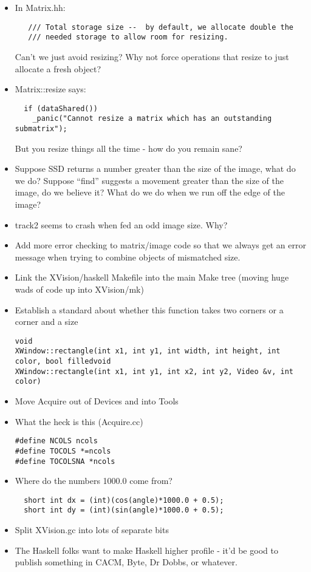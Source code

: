 \begin{itemize}
\item
In Matrix.hh:
\begin{verbatim}
   /// Total storage size --  by default, we allocate double the
   /// needed storage to allow room for resizing.
\end{verbatim}
Can't we just avoid resizing?
Why not force operations that resize to just allocate a fresh object?

\item
Matrix::resize says:
\begin{verbatim}
  if (dataShared())
    _panic("Cannot resize a matrix which has an outstanding submatrix");
\end{verbatim}
But you resize things all the time - how do you remain sane?

\item
Suppose SSD returns a number greater than the size of the image, what
do we do?  Suppose ``find'' suggests a movement greater than the size
of the image, do we believe it?  What do we do when we run off the
edge of the image?

\item
track2 seems to crash when fed an odd image size.  Why?

\item
Add more error checking to matrix/image code so that we always get an
error message when trying to combine objects of mismatched size.

\item
Link the XVision/haskell Makefile into the main Make tree
(moving huge wads of code up into XVision/mk)

\item
Establish a standard about whether this function takes two corners
or a corner and a size
\begin{verbatim}
void
XWindow::rectangle(int x1, int y1, int width, int height, int color, bool filledvoid
XWindow::rectangle(int x1, int y1, int x2, int y2, Video &v, int color)
\end{verbatim}

\item
Move Acquire out of Devices and into Tools

\item
What the heck is this (Acquire.cc)
\begin{verbatim}
#define NCOLS ncols
#define TOCOLS *=ncols
#define TOCOLSNA *ncols
\end{verbatim}

\item
Where do the numbers 1000.0 come from?
\begin{verbatim}
  short int dx = (int)(cos(angle)*1000.0 + 0.5);
  short int dy = (int)(sin(angle)*1000.0 + 0.5);
\end{verbatim}

\item
Split XVision.gc into lots of separate bits

\item
The Haskell folks want to make Haskell higher profile - it'd be good
to publish something in CACM, Byte, Dr Dobbs, or whatever.

\end{itemize}

